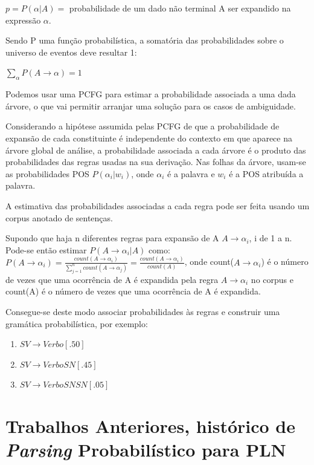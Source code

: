 $p=P(\alpha |A) = $ probabilidade de um dado não terminal A ser expandido na expressão $ \alpha. $

Sendo P uma função probabilística, a somatória das probabilidades sobre o universo de eventos deve resultar 1: 

$\sum_\alpha P(A \rightarrow \alpha)=1 $

Podemos usar uma PCFG para estimar a probabilidade associada a uma dada árvore, o que vai permitir arranjar uma solução para os casos de ambiguidade. 

Considerando a hipótese assumida pelas PCFG de que a probabilidade de expansão de cada constituinte é independente do contexto em que aparece na árvore global de análise, a probabilidade associada a cada árvore é o produto das probabilidades das regras usadas na sua derivação. Nas folhas da árvore, usam-se as probabilidades POS $P(\alpha_i|w_i)$, onde  $\alpha_i$ é a palavra e $w_i$ é a POS atribuída a palavra.

A estimativa das probabilidades associadas a cada regra pode ser feita usando um corpus anotado de sentenças.

Supondo que haja n diferentes regras para expansão de A $A \rightarrow \alpha_i $, i de 1 a n.
\\
Pode-se então estimar $P(A \rightarrow \alpha_i|A)$ como:
\\

$ P(A \rightarrow \alpha_i) = \frac{count(A \rightarrow \alpha_i)}{\sum_{j=1}^n count(A \rightarrow \alpha_j)} = \frac{count(A \rightarrow \alpha_i)}{count(A)} $, onde count($A \rightarrow \alpha_i$) é o número de vezes que uma ocorrência de A é expandida pela regra $A \rightarrow \alpha_i$ no corpus e count(A) é o número de vezes que uma ocorrência de A é expandida.

Consegue-se deste modo associar probabilidades às regras e construir uma gramática probabilística, por exemplo:

\begin{enumerate}
  \item  $SV \rightarrow Verbo [.50]$
  \item  $SV \rightarrow Verbo SN [.45]$
  \item  $SV \rightarrow Verbo SN SN [.05]$
\end{enumerate}


\section{Trabalhos Anteriores, histórico de \emph{Parsing} Probabilístico para PLN}
\label{sec:trab_anter}

